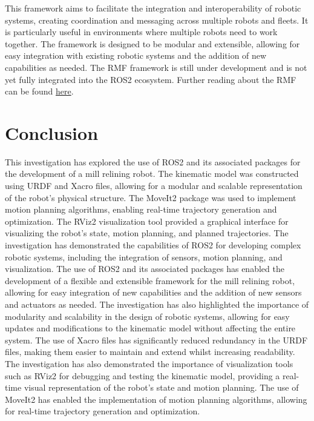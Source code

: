 \documentclass[10pt,a4paper,english]{article}
\begin{document}
This framework aims to facilitate the integration and interoperability of robotic systems, creating coordination and messaging across multiple robots and fleets. It is particularly useful in environments where multiple robots need to work together. The framework is designed to be modular and extensible, allowing for easy integration with existing robotic systems and the addition of new capabilities as needed. The RMF framework is still under development and is not yet fully integrated into the ROS2 ecosystem.
Further reading about the RMF can be found \href{https://osrf.github.io/ros2multirobotbook/intro.html}{here}.
\newpage



\section{Conclusion}
This investigation has explored the use of ROS2 and its associated packages for the development of a mill relining robot. The kinematic model was constructed using URDF and Xacro files, allowing for a modular and scalable representation of the robot's physical structure. The MoveIt2 package was used to implement motion planning algorithms, enabling real-time trajectory generation and optimization. The RViz2 visualization tool provided a graphical interface for visualizing the robot's state, motion planning, and planned trajectories.
The investigation has demonstrated the capabilities of ROS2 for developing complex robotic systems, including the integration of sensors, motion planning, and visualization. The use of ROS2 and its associated packages has enabled the development of a flexible and extensible framework for the mill relining robot, allowing for easy integration of new capabilities and the addition of new sensors and actuators as needed. The investigation has also highlighted the importance of modularity and scalability in the design of robotic systems, allowing for easy updates and modifications to the kinematic model without affecting the entire system. The use of Xacro files has significantly reduced redundancy in the URDF files, making them easier to maintain and extend whilst increasing readability. The investigation has also demonstrated the importance of visualization tools such as RViz2 for debugging and testing the kinematic model, providing a real-time visual representation of the robot's state and motion planning. The use of MoveIt2 has enabled the implementation of motion planning algorithms, allowing for real-time trajectory generation and optimization.
\end{document}
